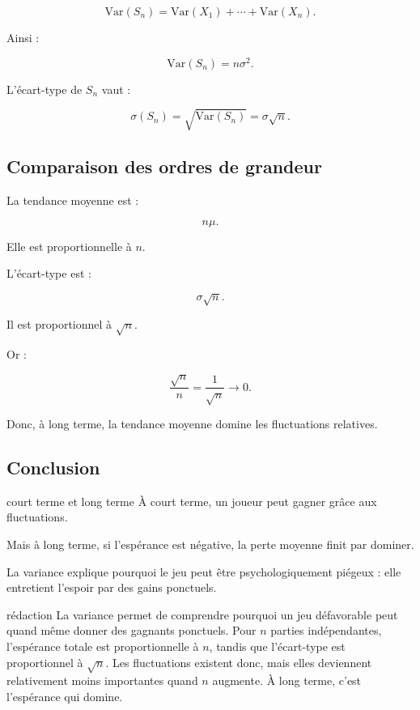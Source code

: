 \documentclass[11pt,a4paper]{article}
\newcommand{\V}{\mathrm{Var}}
\begin{document}
\[
\V(S_n)=\V(X_1)+\cdots+\V(X_n).
\]

Ainsi :

\[
\V(S_n)=n\sigma^2.
\]

L'écart-type de $S_n$ vaut :

\[
\sigma(S_n)=\sqrt{\V(S_n)}=\sigma\sqrt{n}.
\]

\subsection{Comparaison des ordres de grandeur}

La tendance moyenne est :

\[
n\mu.
\]

Elle est proportionnelle à $n$.

L'écart-type est :

\[
\sigma\sqrt{n}.
\]

Il est proportionnel à $\sqrt{n}$.

Or :

\[
\frac{\sqrt{n}}{n}=\frac{1}{\sqrt{n}}\to 0.
\]

Donc, à long terme, la tendance moyenne domine les fluctuations relatives.

\subsection{Conclusion}

\begin{conclusionbox}{court terme et long terme}
À court terme, un joueur peut gagner grâce aux fluctuations.

Mais à long terme, si l'espérance est négative, la perte moyenne finit par dominer.

La variance explique pourquoi le jeu peut être psychologiquement piégeux : elle entretient l'espoir par des gains ponctuels.
\end{conclusionbox}

\begin{oral}{rédaction}
La variance permet de comprendre pourquoi un jeu défavorable peut quand même donner des gagnants ponctuels. Pour $n$ parties indépendantes, l'espérance totale est proportionnelle à $n$, tandis que l'écart-type est proportionnel à $\sqrt{n}$. Les fluctuations existent donc, mais elles deviennent relativement moins importantes quand $n$ augmente. À long terme, c'est l'espérance qui domine.
\end{oral}

\end{document}
